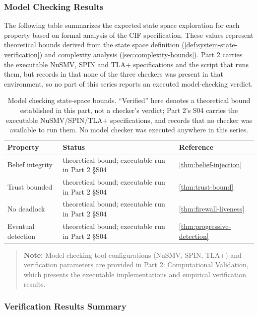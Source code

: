 \documentclass[
]{article}
\newcounter{none} %
\begin{document}
\subsubsection{Model Checking Results}\label{sec:mc-results}

The following table summarizes the expected state space exploration for
each property based on formal analysis of the CIF specification. These
values represent theoretical bounds derived from the state space
definition (\cref{def:system-state-verification}) and complexity
analysis (\cref{sec:complexity-bounds}). Part 2 carries the executable
NuSMV, SPIN and TLA+ specifications and the script that runs them, but
records in  that none
of the three checkers was present in that environment, so no part of
this series reports an executed model-checking verdict.

\begin{table}[htbp]
\centering
\caption{Model checking state-space bounds. ``Verified'' here denotes a theoretical bound established in this part, not a checker's verdict; Part 2's S04 carries the executable NuSMV/SPIN/TLA+ specifications, and records that no checker was available to run them. No model checker was executed anywhere in this series.}
\label{tab:mc-results}
\begin{tabular}{@{}lll@{}}
\toprule
Property & Status & Reference \\
\midrule
Belief integrity & theoretical bound; executable run in Part 2 §S04 & \cref{thm:belief-injection} \\
Trust bounded & theoretical bound; executable run in Part 2 §S04 & \cref{thm:trust-bound} \\
No deadlock & theoretical bound; executable run in Part 2 §S04 & \cref{thm:firewall-liveness} \\
Eventual detection & theoretical bound; executable run in Part 2 §S04 & \cref{thm:progressive-detection} \\
\bottomrule
\end{tabular}
\end{table}

\begin{quote}
\textbf{Note:} Model checking tool configurations (NuSMV, SPIN, TLA+)
and verification parameters are provided in Part 2: Computational
Validation, which presents the executable implementations and empirical
verification results.
\end{quote}

\subsubsection{Verification Results
Summary}\label{sec:verification-summary}
\end{document}
